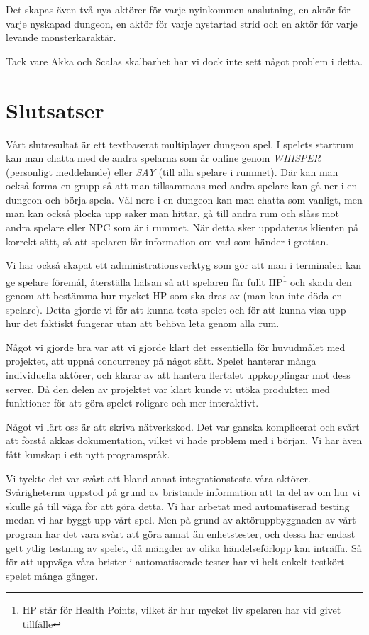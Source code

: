 \documentclass[a4paper]{article}
\begin{document}
Det skapas även två nya aktörer för varje nyinkommen anslutning, en aktör för varje nyskapad dungeon, en aktör för varje
nystartad strid och en aktör för varje levande monsterkaraktär.

Tack vare Akka och Scalas skalbarhet har vi dock inte sett något problem i detta.

\section{Slutsatser}
Vårt slutresultat är ett textbaserat multiplayer dungeon spel. I spelets startrum kan man chatta med de andra spelarna som är online genom \textit{WHISPER} (personligt meddelande) eller \textit{SAY} (till alla spelare i rummet). Där kan man också forma en grupp så att man tillsammans med andra spelare kan gå ner i en dungeon och börja spela. Väl nere i en dungeon kan man chatta som vanligt, men man kan också plocka upp saker man hittar, gå till andra rum och slåss mot andra spelare eller NPC som är i rummet. När detta sker uppdateras klienten på korrekt sätt, så att spelaren får information om vad som händer i grottan.

Vi har också skapat ett administrationsverktyg som gör att man i terminalen kan ge spelare föremål, återställa hälsan så att spelaren får fullt HP\footnote{HP står för Health Points, vilket är hur mycket liv spelaren har vid givet tillfälle} och skada den genom att bestämma hur mycket HP som ska dras av (man kan inte döda en spelare). Detta gjorde vi för att kunna testa spelet och för att kunna visa upp hur det faktiskt fungerar utan att behöva leta genom alla rum.     

Något vi gjorde bra var att vi gjorde klart det essentiella för huvudmålet med projektet, att uppnå concurrency på något sätt. Spelet hanterar många individuella aktörer, och klarar av att hantera flertalet uppkopplingar mot dess server. 
Då den delen av projektet var klart kunde vi utöka produkten med funktioner för att göra spelet roligare och mer interaktivt. 

Något vi lärt oss är att skriva nätverkskod. Det var ganska komplicerat och svårt att förstå akkas dokumentation, vilket vi hade problem med i början. Vi har även fått kunskap i ett nytt programspråk.

Vi tyckte det var svårt att bland annat integrationstesta våra aktörer. Svårigheterna uppstod på grund av bristande information att ta del av om hur vi skulle gå till väga för att göra detta.
Vi har arbetat med automatiserad testing medan vi har byggt upp vårt spel. Men på grund av aktöruppbyggnaden av vårt program har det vara svårt att göra annat än enhetstester, och dessa har endast gett ytlig testning av spelet, då mängder av olika händelseförlopp kan inträffa. Så för att uppväga våra brister i automatiserade tester har vi helt enkelt testkört spelet många gånger. 
\end{document}
